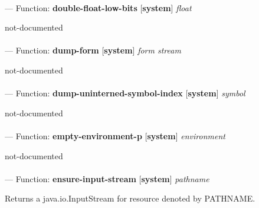 \paragraph{}
\label{SYSTEM:DOUBLE-FLOAT-LOW-BITS}
--- Function: \textbf{double-float-low-bits} [\textbf{system}] \textit{float}

\begin{adjustwidth}{5em}{5em}
not-documented
\end{adjustwidth}

\paragraph{}
\label{SYSTEM:DUMP-FORM}
--- Function: \textbf{dump-form} [\textbf{system}] \textit{form stream}

\begin{adjustwidth}{5em}{5em}
not-documented
\end{adjustwidth}

\paragraph{}
\label{SYSTEM:DUMP-UNINTERNED-SYMBOL-INDEX}
--- Function: \textbf{dump-uninterned-symbol-index} [\textbf{system}] \textit{symbol}

\begin{adjustwidth}{5em}{5em}
not-documented
\end{adjustwidth}

\paragraph{}
\label{SYSTEM:EMPTY-ENVIRONMENT-P}
--- Function: \textbf{empty-environment-p} [\textbf{system}] \textit{environment}

\begin{adjustwidth}{5em}{5em}
not-documented
\end{adjustwidth}

\paragraph{}
\label{SYSTEM:ENSURE-INPUT-STREAM}
--- Function: \textbf{ensure-input-stream} [\textbf{system}] \textit{pathname}

\begin{adjustwidth}{5em}{5em}
Returns a java.io.InputStream for resource denoted by PATHNAME.
\end{adjustwidth}

